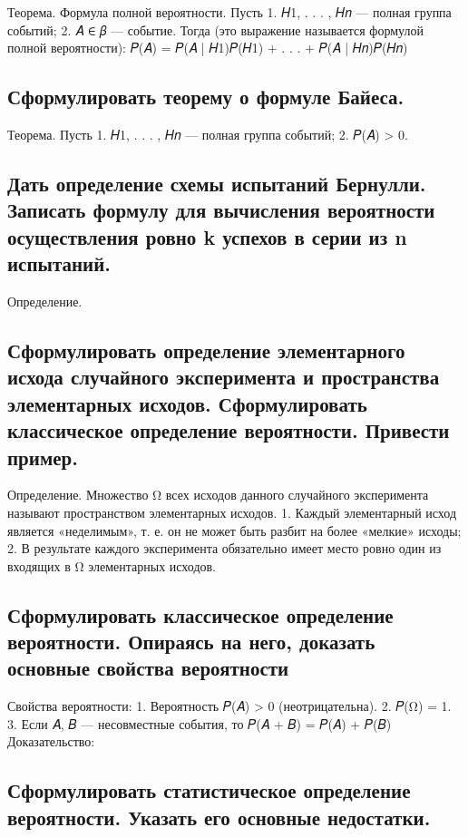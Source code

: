 Теорема. Формула полной вероятности. Пусть 
1. 𝐻1, . . . , 𝐻𝑛 — полная группа событий;
2. 𝐴 ∈ 𝛽 — событие.
Тогда (это выражение называется формулой полной вероятности): 𝑃(𝐴) = 𝑃(𝐴 | 𝐻1)𝑃(𝐻1) + . . . + 𝑃(𝐴 | 𝐻𝑛)𝑃(𝐻𝑛)

\subsection{Сформулировать теорему о формуле Байеса.}

Теорема. Пусть 
1. 𝐻1, . . . , 𝐻𝑛 — полная группа событий; 
2. 𝑃(𝐴) > 0. 

\subsection{Дать определение схемы испытаний Бернулли. Записать формулу для вычисления вероятности осуществления ровно k успехов в серии из n испытаний.}

Определение. 

\subsection{Сформулировать определение элементарного исхода случайного эксперимента и пространства элементарных исходов. Сформулировать классическое определение вероятности. Привести пример.}

Определение. Множество Ω всех исходов данного случайного эксперимента называют пространством элементарных исходов. 
1. Каждый элементарный исход является «неделимым», т. е. он не может быть разбит на более «мелкие» исходы; 
2. В результате каждого эксперимента обязательно имеет место ровно один из входящих в Ω элементарных исходов.

\subsection{Сформулировать классическое определение вероятности. Опираясь на него, доказать основные свойства вероятности}

Свойства вероятности:
1. Вероятность 𝑃(𝐴) > 0 (неотрицательна). 
2. 𝑃(Ω) = 1. 
3. Если 𝐴, 𝐵 — несовместные события, то 𝑃(𝐴 + 𝐵) = 𝑃(𝐴) + 𝑃(𝐵)
Доказательство:

\subsection{Сформулировать статистическое определение вероятности. Указать его основные недостатки.}

